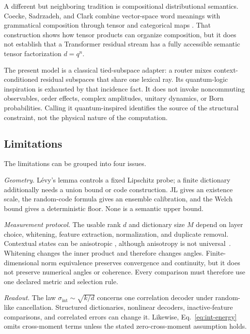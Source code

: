 \documentclass[
  aps,
  reprint,
  superscriptaddress,
  floatfix,
  nofootinbib,
  longbibliography
]{revtex4-2}
\newcommand{\Msem}{M}
\newcommand{\sint}{\sigma_{\mathrm{int}}}
\begin{document}
A different but neighboring tradition is compositional distributional
semantics.  Coecke, Sadrzadeh, and Clark combine vector-space word meanings
with grammatical composition through tensor and categorical maps
\cite{coecke2010compositional}.  That construction shows how tensor products
can organize composition, but it does not establish that a Transformer
residual stream has a fully accessible semantic tensor factorization
$d=q^n$.

The present model is a classical tied-subspace adapter: a router mixes
context-conditioned residual subspaces that share one lexical ray.  Its
quantum-logic inspiration is exhausted by that incidence fact.  It does not
invoke noncommuting observables, order effects, complex amplitudes, unitary
dynamics, or Born probabilities.  Calling it quantum-inspired identifies the
source of the structural constraint, not the physical nature of the
computation.

\subsection{Limitations}
\label{sec:limitations}

The limitations can be grouped into four issues.

\emph{Geometry.}  L\'evy's lemma controls a fixed Lipschitz probe; a finite
dictionary additionally needs a union bound or code construction.  JL gives
an existence scale, the random-code formula gives an ensemble calibration,
and the Welch bound gives a deterministic floor.  None is a semantic upper
bound.

\emph{Measurement protocol.}  The usable rank $d$ and dictionary size $\Msem$
depend on layer choice, whitening, feature extraction, normalization, and
duplicate removal.  Contextual states can be anisotropic
\cite{ethayarajh2019,gao2019representation,mu2018allbutthetop,razzhigaev2024shape},
although anisotropy is not universal~\cite{machina2024anisotropy}.  Whitening
changes the inner product and therefore changes angles.  Finite-dimensional
norm equivalence preserves convergence and continuity, but it does not
preserve numerical angles or coherence.  Every comparison must therefore use
one declared metric and selection rule.

\emph{Readout.}  The law $\sint\sim\sqrt{k/d}$ concerns one correlation
decoder under random-like cancellation.  Structured dictionaries, nonlinear
decoders, inactive-feature comparisons, and correlated errors can change it.
Likewise, Eq.~\eqref{eq:int-energy} omits cross-moment terms unless the stated
zero-cross-moment assumption holds.
\end{document}
